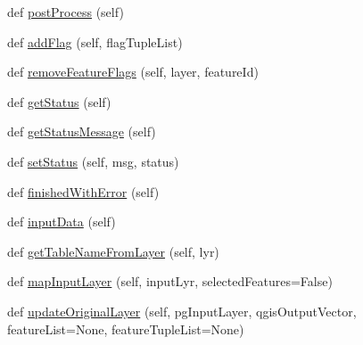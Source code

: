 \begin{DoxyCompactItemize}
\item 
def \mbox{\hyperlink{class_dsg_tools_1_1_validation_tools_1_1_validation_processes_1_1validation_process_1_1_validation_process_a9616e61b462e79c620cb52c57db9ba6f}{post\+Process}} (self)
\item 
def \mbox{\hyperlink{class_dsg_tools_1_1_validation_tools_1_1_validation_processes_1_1validation_process_1_1_validation_process_a57cad7b940bc478076d12aca952d0a8c}{add\+Flag}} (self, flag\+Tuple\+List)
\item 
def \mbox{\hyperlink{class_dsg_tools_1_1_validation_tools_1_1_validation_processes_1_1validation_process_1_1_validation_process_ae186e13b7a324f4f301f1c7d9cb7c8de}{remove\+Feature\+Flags}} (self, layer, feature\+Id)
\item 
def \mbox{\hyperlink{class_dsg_tools_1_1_validation_tools_1_1_validation_processes_1_1validation_process_1_1_validation_process_a6668cd6df331f36ef02772e98045242b}{get\+Status}} (self)
\item 
def \mbox{\hyperlink{class_dsg_tools_1_1_validation_tools_1_1_validation_processes_1_1validation_process_1_1_validation_process_a00ab1786a814a65c53db1fac5d3f6218}{get\+Status\+Message}} (self)
\item 
def \mbox{\hyperlink{class_dsg_tools_1_1_validation_tools_1_1_validation_processes_1_1validation_process_1_1_validation_process_a3223ba23a7c5c3f164594a742f1dcdc2}{set\+Status}} (self, msg, status)
\item 
def \mbox{\hyperlink{class_dsg_tools_1_1_validation_tools_1_1_validation_processes_1_1validation_process_1_1_validation_process_aac7b8c0a5333c380bb0af64353717fb9}{finished\+With\+Error}} (self)
\item 
def \mbox{\hyperlink{class_dsg_tools_1_1_validation_tools_1_1_validation_processes_1_1validation_process_1_1_validation_process_a33940a37926ede6b6720f7748aa43b81}{input\+Data}} (self)
\item 
def \mbox{\hyperlink{class_dsg_tools_1_1_validation_tools_1_1_validation_processes_1_1validation_process_1_1_validation_process_af2197dc08fcfd047122fbf2a48bba20e}{get\+Table\+Name\+From\+Layer}} (self, lyr)
\item 
def \mbox{\hyperlink{class_dsg_tools_1_1_validation_tools_1_1_validation_processes_1_1validation_process_1_1_validation_process_a43ee755fd00bc31c3c222c8b7dfe7f53}{map\+Input\+Layer}} (self, input\+Lyr, selected\+Features=False)
\item 
def \mbox{\hyperlink{class_dsg_tools_1_1_validation_tools_1_1_validation_processes_1_1validation_process_1_1_validation_process_a22e152437a5ec56199f606139b5194dd}{update\+Original\+Layer}} (self, pg\+Input\+Layer, qgis\+Output\+Vector, feature\+List=None, feature\+Tuple\+List=None)

\end{DoxyCompactItemize}

